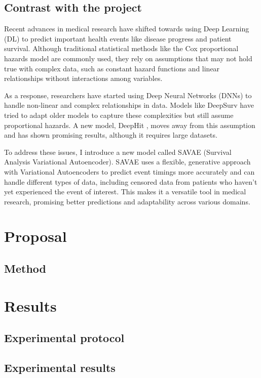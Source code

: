 \documentclass{article}
\begin{document}
\subsection{Contrast with the project}

Recent advances in medical research have shifted towards using Deep Learning (DL) to predict important health events like disease progress and patient survival. Although traditional statistical methods like the Cox proportional hazards model \cite{kraisangka2018bayesian} are commonly used, they rely on assumptions that may not hold true with complex data, such as constant hazard functions and linear relationships without interactions among variables. 

As a response, researchers have started using Deep Neural Networks (DNNs) to handle non-linear and complex relationships in data. Models like DeepSurv \cite{jared2016deep} have tried to adapt older models to capture these complexities but still assume proportional hazards. A new model, DeepHit \cite{lee2018deephit}, moves away from this assumption and has shown promising results, although it requires large datasets. 

To address these issues, I introduce a new model called SAVAE (Survival Analysis Variational Autoencoder). SAVAE uses a flexible, generative approach with Variational Autoencoders to predict event timings more accurately and can handle different types of data, including censored data from patients who haven't yet experienced the event of interest. This makes it a versatile tool in medical research, promising better predictions and adaptability across various domains.

\section{Proposal}
\subsection{Method}

\section{Results}
\subsection{Experimental protocol}
\subsection{Experimental results}
\end{document}
